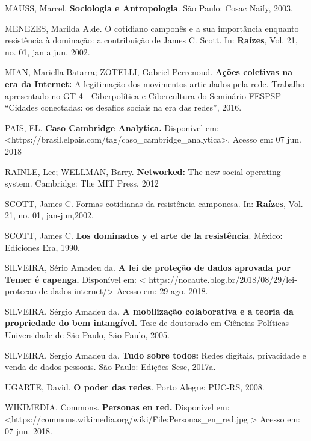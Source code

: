 MAUSS, Marcel. \textbf{Sociologia e Antropologia}. São Paulo: Cosac
Naify, 2003.

MENEZES, Marilda A.de. O cotidiano camponês e a sua importância enquanto
resistência à dominação: a contribuição de James C. Scott. In:
\textbf{Raízes}, Vol. 21, no. 01, jan a jun. 2002.

MIAN, Mariella Batarra; ZOTELLI, Gabriel Perrenoud. \textbf{Ações
coletivas na era da Internet:} A legitimação dos movimentos articulados
pela rede. Trabalho apresentado no GT 4 - Ciberpolítica e Cibercultura
do Seminário FESPSP ``Cidades conectadas: os desafios sociais na era das
redes'', 2016.

PAIS, EL. \textbf{Caso Cambridge Analytica.} Disponível em:
\textless{}https://brasil.elpais.com/tag/caso\_cambridge\_analytica\textgreater{}.
Acesso em: 07 jun. 2018

RAINLE, Lee; WELLMAN, Barry. \textbf{Networked:} The new social
operating system. Cambridge: The MIT Press, 2012

SCOTT, James C. Formas cotidianas da resistência camponesa. In:
\textbf{Raízes}, Vol. 21, no. 01, jan-jun,2002.

SCOTT, James C. \textbf{Los dominados y el arte de la resistência}.
México: Ediciones Era, 1990.

SILVEIRA, Sério Amadeu da. \textbf{A lei de proteção de dados aprovada
por Temer é capenga.} Disponível em: \textless{}
https://nocaute.blog.br/2018/08/29/lei-protecao-de-dados-internet/\textgreater{}
Acesso em: 29 ago. 2018.

SILVEIRA, Sérgio Amadeu da. \textbf{A mobilização colaborativa e a
teoria da propriedade do bem intangível.} Tese de doutorado em Ciências
Políticas - Universidade de São Paulo, São Paulo, 2005.

SILVEIRA, Sergio Amadeu da. \textbf{Tudo sobre todos:} Redes digitais,
privacidade e venda de dados pessoais. São Paulo: Edições Sesc, 2017a.

UGARTE, David. \textbf{O poder das redes}. Porto Alegre: PUC-RS, 2008.

WIKIMEDIA, Commons. \textbf{Personas en red.} Disponível em:
\textless{}https://commons.wikimedia.org/wiki/File:Personas\_en\_red.jpg
\textgreater{} Acesso em: 07 jun. 2018.
